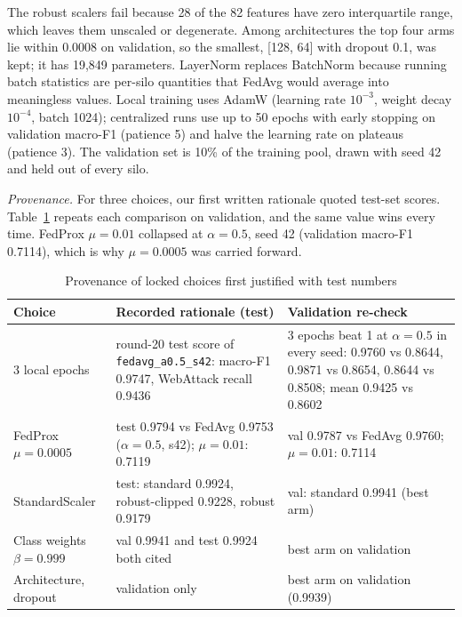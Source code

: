 The robust scalers fail because 28 of the 82 features have zero interquartile range, %
which leaves them unscaled or degenerate. Among architectures the top four arms lie
within 0.0008 on validation, so the smallest, [128, 64] with dropout 0.1, was kept; it %
has 19,849 parameters. LayerNorm replaces BatchNorm because running batch statistics are %
per-silo quantities that FedAvg would average into meaningless values. Local training uses
AdamW (learning rate $10^{-3}$, weight decay $10^{-4}$, batch 1024); centralized runs %
use up to 50 epochs with early stopping on validation macro-F1 (patience 5) and halve %
the learning rate on plateaus (patience 3). The validation set is 10\% of the training %
pool, drawn with seed 42 and held out of every silo. %

\emph{Provenance.} For three choices, our first written rationale quoted test-set
scores. Table~\ref{tab:provenance} repeats each comparison on validation, and the same
value wins every time. FedProx $\mu=0.01$ collapsed at $\alpha=0.5$, seed 42 (validation macro-F1 %
0.7114), which is why $\mu=0.0005$ was carried forward. %

\begin{table}[t]
\centering
\caption{Provenance of locked choices first justified with test numbers}
\label{tab:provenance}
\footnotesize
\begin{tabularx}{\textwidth}{@{}lXX@{}}
\toprule
Choice & Recorded rationale (test) & Validation re-check\\
\midrule
3 local epochs & round-20 test score of \texttt{fedavg\_a0.5\_s42}: macro-F1 0.9747, WebAttack recall 0.9436 & 3 epochs beat 1 at $\alpha=0.5$ in every seed: 0.9760 vs 0.8644, 0.9871 vs 0.8654, 0.8644 vs 0.8508; mean 0.9425 vs 0.8602\\ %
FedProx $\mu=0.0005$ & test 0.9794 vs FedAvg 0.9753 ($\alpha=0.5$, s42); $\mu=0.01$: 0.7119 & val 0.9787 vs FedAvg 0.9760; $\mu=0.01$: 0.7114\\ %
StandardScaler & test: standard 0.9924, robust-clipped 0.9228, robust 0.9179 & val: standard 0.9941 (best arm)\\ %
Class weights $\beta=0.999$ & val 0.9941 and test 0.9924 both cited & best arm on validation\\ %
Architecture, dropout & validation only & best arm on validation (0.9939)\\ %
\bottomrule
\end{tabularx}
\end{table}


